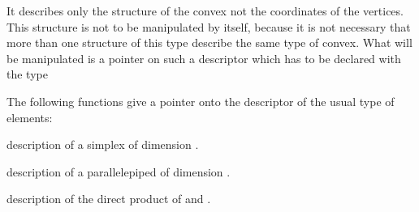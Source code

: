 \documentclass[a4paper,11pt,english]{sphinxmanual}
\begin{document}
It describes only the structure of the convex not the coordinates of the
vertices. This structure is not to be manipulated by itself, because it is not
necessary that more than one structure of this type describe the same type of
convex. What will be manipulated is a pointer on such a descriptor which has to
be declared with the type 

The following functions give a pointer onto the descriptor of the usual type of
elements:

\begin{fulllineitems}
\label{\detokenize{project/femdesc:_CPPv4N5bgeot17simplex_structureE8dim_type}}%
\pysigstartmultiline
{}%
\pysigstopmultiline
description of a simplex of dimension .

\end{fulllineitems}


\begin{fulllineitems}
\label{\detokenize{project/femdesc:_CPPv4N5bgeot24parallelepiped_structureE8dim_type}}%
\pysigstartmultiline
{}%
\pysigstopmultiline
description of a parallelepiped of dimension .

\end{fulllineitems}


\begin{fulllineitems}
\label{\detokenize{project/femdesc:_CPPv4N5bgeot24convex_product_structureEN5bgeot17pconvex_structureE17pconvex_structure}}%
\pysigstartmultiline
{}%
\pysigstopmultiline
description of the direct product of  and .

\end{fulllineitems}
\end{document}
